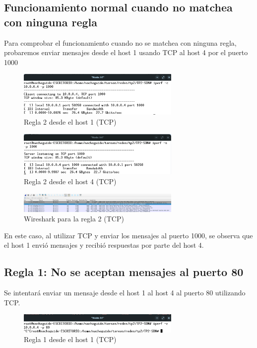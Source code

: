 \documentclass[titlepage,a4paper]{article}
\begin{document}
\subsection{Funcionamiento normal cuando no matchea con ninguna regla}
Para comprobar el funcionamiento cuando no se matchea con ninguna regla, probaremos enviar mensajes desde el host 1 usando TCP al host 4 por el puerto 1000

\begin{figure}[H]
    \centering
    \includegraphics[width=0.7\textwidth]{img/regla2_h1_tcp.png}
    \caption{Regla 2 desde el host 1 (TCP)}
\end{figure}

\begin{figure}[H]
    \centering
    \includegraphics[width=0.7\textwidth]{img/regla2_h4_tcp.png}
    \caption{Regla 2 desde el host 4 (TCP)}
\end{figure}

\begin{figure}[H]
    \centering
    \includegraphics[width=0.7\textwidth]{img/regla2_wireshark_tcp.png}
    \caption{Wireshark para la regla 2 (TCP)}
\end{figure}

En este caso, al utilizar TCP y enviar los mensajes al puerto 1000, se observa que el host 1 envió mensajes y recibió respuestas por parte del host 4.


\subsection{Regla 1: No se aceptan mensajes al puerto 80}
Se intentará enviar un mensaje desde el host 1 al host 4 al puerto 80 utilizando TCP.

\begin{figure}[H]
    \centering
    \includegraphics[width=0.7\textwidth]{img/regla1_h1_tcp.png}
    \caption{Regla 1 desde el host 1 (TCP)}
\end{figure}
\end{document}
